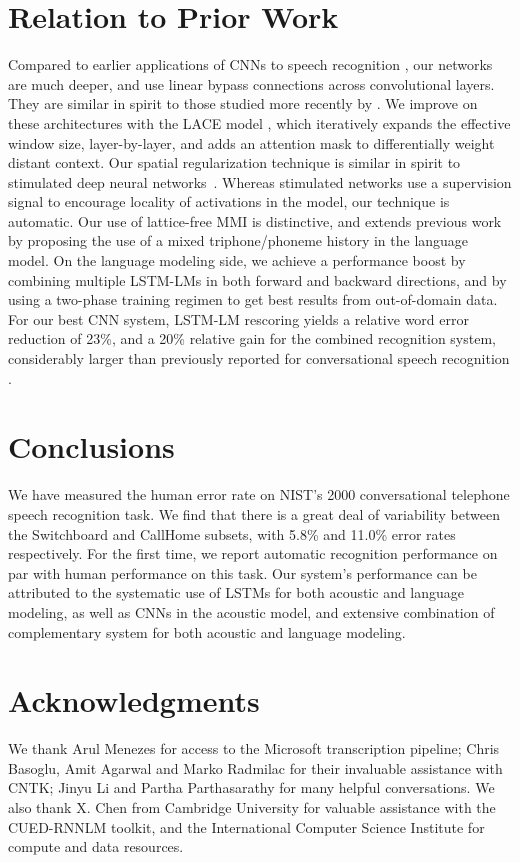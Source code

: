\documentclass{article}
\begin{document}
\section{Relation to Prior Work}
\label{sec:prior}
Compared to earlier applications of CNNs to speech recognition
\cite{sainath2013deep,abdel2012applying}, our networks are 
much deeper, and use linear bypass connections across convolutional
layers. They are similar in spirit to those studied more recently by
\cite{sercu2016very,saon2015ibm,saonSRK16,bi2015very,qian2016very}. We improve on these 
architectures with the LACE model \cite{yu2016deep}, which iteratively
expands the effective window size, layer-by-layer, and adds an
attention mask to differentially weight distant context.
Our spatial regularization technique is similar in spirit to stimulated
deep neural networks~\cite{wu2016stimulated}. Whereas stimulated networks
use a supervision signal to encourage locality of activations in the model,
our technique is automatic.
Our use of 
lattice-free MMI is distinctive, and extends previous work
\cite{chen2006advances,povey2016purely} by proposing the use of a mixed
triphone/phoneme history in the language model.
On the language modeling side, we achieve a performance boost by combining multiple LSTM-LMs 
in both forward and backward directions, and by using a two-phase training regimen to get
best results from out-of-domain data.
For our best CNN system, LSTM-LM rescoring yields a relative word error reduction of 23\%,
and a 20\% relative gain for the combined recognition system, considerably larger than previously 
reported for conversational speech recognition \cite{medennikov2016improving}.
\section{Conclusions}
\label{sec:concl}
We have measured the human error rate on NIST's 2000 conversational telephone speech recognition
task. We find that there is a great deal of variability between the 
Switchboard and CallHome subsets, with 5.8\% and 11.0\% error rates 
respectively. For the first time, we report automatic recognition performance on par with
human performance on this task. 
Our system's performance can be attributed to the systematic use of LSTMs for
both acoustic and language modeling, as well as CNNs in the acoustic
model, and extensive combination of complementary system for both acoustic and language modeling.
\section*{Acknowledgments}
We thank Arul Menezes for access to the Microsoft transcription pipeline;
Chris Basoglu, Amit Agarwal and Marko Radmilac for their invaluable 
assistance with CNTK; Jinyu Li and Partha Parthasarathy for many helpful
conversations.
We also thank X. Chen from Cambridge University for valuable assistance with the CUED-RNNLM toolkit,
and the International Computer Science Institute for compute and data resources.


\end{document}
